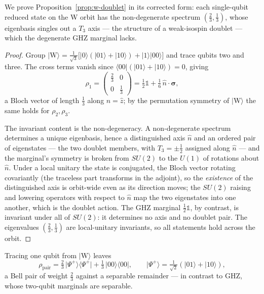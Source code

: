We prove Proposition~\ref{prop:w-doublet} in its corrected form: each single-qubit reduced state on
the W orbit has the non-degenerate spectrum $(\tfrac23,\tfrac13)$, whose eigenbasis singles out a
$T_3$ axis --- the structure of a weak-isospin doublet --- which the degenerate GHZ marginal lacks.

\begin{proof}
Group $\lvert\mathrm{W}\rangle = \tfrac1{\sqrt3}\bigl[\lvert0\rangle(\lvert01\rangle+\lvert10\rangle)
+\lvert1\rangle\lvert00\rangle\bigr]$ and trace qubits two and three. The cross terms vanish since
$\langle00\vert(\lvert01\rangle+\lvert10\rangle) = 0$, giving
\begin{equation}
  \rho_1 = \begin{pmatrix}\tfrac23 & 0\\ 0 & \tfrac13\end{pmatrix}
         = \tfrac12\mathbb{1} + \tfrac16\,\hat n\!\cdot\!\boldsymbol{\sigma},
\end{equation}
a Bloch vector of length $\tfrac13$ along $\hat n = \hat z$; by the permutation symmetry of
$\lvert\mathrm{W}\rangle$ the same holds for $\rho_2,\rho_3$.

The invariant content is the non-degeneracy. A non-degenerate spectrum determines a unique
eigenbasis, hence a distinguished axis $\hat n$ and an ordered pair of eigenstates --- the two
doublet members, with $T_3 = \pm\tfrac12$ assigned along $\hat n$ --- and the marginal's symmetry is
broken from $SU(2)$ to the $U(1)$ of rotations about $\hat n$. Under a local unitary the state is
conjugated, the Bloch vector rotating covariantly (the traceless part transforms in the adjoint),
so the \emph{existence} of the distinguished axis is orbit-wide even as its direction moves; the
$SU(2)$ raising and lowering operators with respect to $\hat n$ map the two eigenstates into one
another, which is the doublet action. The GHZ marginal $\tfrac12\mathbb{1}$, by contrast, is
invariant under all of $SU(2)$: it determines no axis and no doublet pair. The eigenvalues
$(\tfrac23,\tfrac13)$ are local-unitary invariants, so all statements hold across the orbit.
\end{proof}

\begin{corollary}\label{app:cor:bell}
Tracing one qubit from $\lvert\mathrm{W}\rangle$ leaves
\begin{equation}
  \rho_{\mathrm{pair}} = \tfrac23\,\lvert\Psi^+\rangle\langle\Psi^+\rvert
  + \tfrac13\,\lvert00\rangle\langle00\rvert,
  \qquad \lvert\Psi^+\rangle = \tfrac1{\sqrt2}(\lvert01\rangle+\lvert10\rangle),
\end{equation}
a Bell pair of weight $\tfrac23$ against a separable remainder --- in contrast to GHZ, whose
two-qubit marginals are separable.
\end{corollary}

